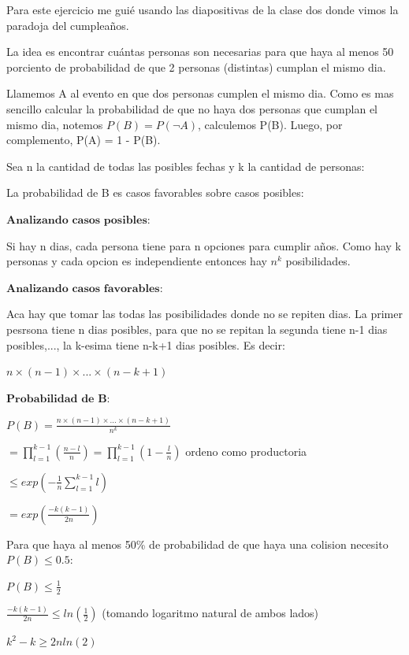 \documentclass[12pt,addpoints,answers]{exam}
\begin{document}
\begin{questions}
\begin{parts}
\begin{solution} 

    Para este ejercicio me guié usando las diapositivas de la clase dos donde vimos la paradoja del cumpleaños.

    La idea es encontrar cuántas personas son necesarias para que haya al menos 50 porciento de probabilidad de 
    que 2 personas (distintas) cumplan el mismo dia. 
    
    Llamemos A al evento en que dos personas cumplen el mismo dia. 
    Como es mas sencillo calcular la probabilidad de que no haya dos personas que cumplan el mismo dia, 
    notemos $P(B) = P(\lnot A)$, calculemos P(B). Luego, por complemento,  P(A) = 1 - P(B).

    Sea n la cantidad de todas las posibles fechas y k la cantidad de personas:


    La probabilidad de B es casos favorables sobre casos posibles:

    $\textbf{Analizando casos posibles}$:

    Si hay n dias, cada persona tiene para n opciones para cumplir años. Como hay k personas y 
    cada opcion es independiente entonces hay $n^k$ posibilidades.

    $\textbf{Analizando casos favorables}$:
    
    Aca hay que tomar las todas las posibilidades donde no se repiten dias. La primer pesrsona tiene n dias posibles, 
    para que no se repitan la segunda tiene n-1 dias posibles,..., la k-esima tiene n-k+1 dias posibles. Es decir:

    $n \times (n-1) \times ... \times (n-k+1)$
    

    $\textbf{Probabilidad de B}$:


    $P(B) = \frac{n \times (n-1) \times ... \times (n-k+1)}{n^k}$


    $= \prod^{k-1}_{l=1}(\frac{n-l}{n}) = \prod^{k-1}_{l=1}(1 - \frac{l}{n})$ ordeno como productoria


    $\leq exp(-\frac{1}{n} \sum^{k-1}_{l=1} l)$ 

    $= exp(\frac{-k(k-1)}{2n})$

    Para que haya al menos 50\% de probabilidad de que haya una colision necesito $P(B) \leq 0.5$:

    $P(B) \leq \frac{1}{2}$

    $\frac{-k(k-1)}{2n} \leq ln(\frac{1}{2})$ (tomando logaritmo natural de ambos lados)
    
    $k^2 - k \geq 2n ln(2)$


\end{solution}
\end{parts}
\end{questions}
\end{document}
